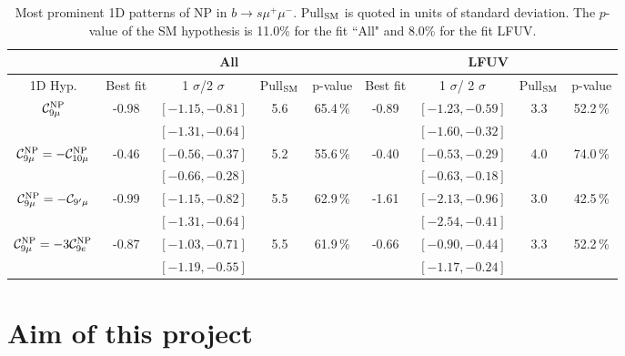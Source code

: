 \documentclass[11pt,amsmath,amssymb]{article}
\newcommand{\Cc}[1]{{\cal C}_{#1}}
\begin{document}
 \begin{table*}[h!] \scriptsize
\begin{tabular}{c||c|c|c|c||c|c|c|c} %
 & \multicolumn{4}{c||}{All} &  \multicolumn{4}{c}{LFUV}\\
\hline
1D Hyp.   & Best fit& 1 $\sigma$/2 $\sigma$   & Pull$_{\rm SM}$ & p-value & Best fit & 1 $\sigma$/ 2 $\sigma$  & Pull$_{\rm SM}$ & p-value\\
\hline\hline
\multirow{2}{*}{$\Cc{9\mu}^{\rm NP}$}    & \multirow{2}{*}{-0.98} &    $[-1.15,-0.81]$ &    \multirow{2}{*}{5.6}   & \multirow{2}{*}{65.4\,\%}
&   \multirow{2}{*}{-0.89}   &$[-1.23,-0.59]$&   \multirow{2}{*}{3.3}  & \multirow{2}{*}{52.2\,\%}  \\
 &  & $[-1.31,-0.64]$ &  & &  &  $[-1.60,-0.32]$ & \\
 \multirow{2}{*}{$\Cc{9\mu}^{\rm NP}=-\Cc{10\mu}^{\rm NP}$}    &   \multirow{2}{*}{-0.46} &    $[-0.56,-0.37]$ &   \multirow{2}{*}{5.2}  & \multirow{2}{*}{55.6\,\%}
 &  \multirow{2}{*}{-0.40}   &   $[-0.53,-0.29]$ & \multirow{2}{*}{4.0}   & \multirow{2}{*}{74.0\,\%}  \\
 &  & $[-0.66,-0.28]$ &  & & & $[-0.63,-0.18]$  &    \\
 \multirow{2}{*}{$\Cc{9\mu}^{\rm NP}=-\Cc{9'\mu}$}     & \multirow{2}{*}{-0.99} &    $[-1.15,-0.82]$   &  \multirow{2}{*}{5.5}  & \multirow{2}{*}{62.9\,\%}
 &  \multirow{2}{*}{-1.61}   &    $[-2.13,-0.96]$  & \multirow{2}{*}{3.0} & \multirow{2}{*}{42.5\,\%} \\
 &  & $[-1.31,-0.64]$ &  & & & $[-2.54,-0.41]$ &    \\
\hline
 \multirow{2}{*}{$\Cc{9\mu}^{\rm NP}=-3 \Cc{9e}^{\rm NP}$} & \multirow{2}{*}{-0.87}  & $[-1.03,-0.71]$ & \multirow{2}{*}{5.5}  & \multirow{2}{*}{61.9\,\%}
  &   \multirow{2}{*}{-0.66} &    $[-0.90,-0.44]$ & \multirow{2}{*}{3.3}  & \multirow{2}{*}{52.2\,\%}
\\
 & & $[-1.19,-0.55]$ &  & & & $[-1.17,-0.24]$     & \\
\end{tabular} \scriptsize
\caption{Most prominent 1D patterns of NP in $b\to s\mu^+\mu^-$. Pull$_{\rm SM}$ is quoted in units of standard deviation. The $p$-value of the SM hypothesis is 11.0\% for the fit ``All" and 8.0\% for the fit LFUV.} \scriptsize
\label{tab:results1D}
\end{table*}


\section{Aim of this project}
\end{document}
